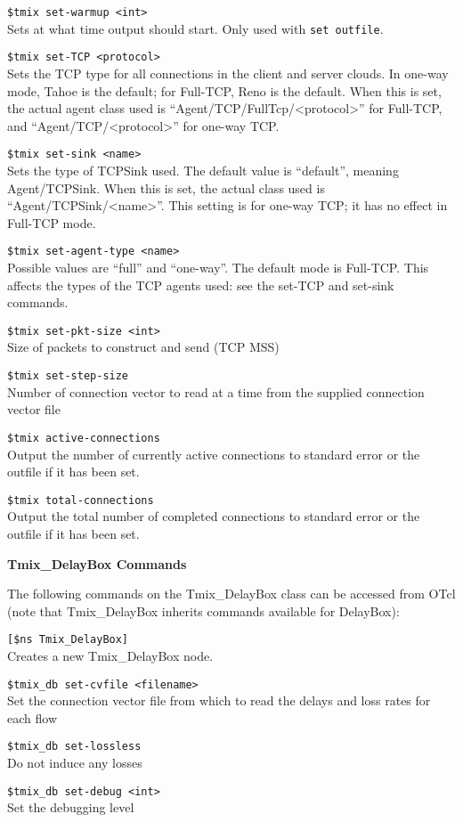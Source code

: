 {\tt \$tmix set-warmup <int>}\\
Sets at what time output should start.  Only used with {\tt set outfile}.

{\tt \$tmix set-TCP <protocol>}\\
Sets the TCP type for all connections in the client and server clouds. In one-way mode, Tahoe is the default; for Full-TCP, Reno is the default. When this is set, the actual agent class used is ``Agent/TCP/FullTcp/<protocol>'' for Full-TCP, and ``Agent/TCP/<protocol>'' for one-way TCP.

{\tt \$tmix set-sink <name>}\\
Sets the type of TCPSink used. The default value is ``default'', meaning Agent/TCPSink. When this is set, the actual class used is ``Agent/TCPSink/<name>''. This setting is for one-way TCP; it has no effect in Full-TCP mode.

{\tt \$tmix set-agent-type <name>}\\
Possible values are ``full'' and ``one-way''. The default mode is Full-TCP. This affects the types of the TCP agents used: see the set-TCP and set-sink commands.

{\tt \$tmix set-pkt-size <int>}\\
Size of packets to construct and send (TCP MSS)

{\tt \$tmix set-step-size}\\
Number of connection vector to read at a time from the supplied connection vector file

{\tt \$tmix active-connections}\\
Output the number of currently active connections to standard error or the
outfile if it has been set.

{\tt \$tmix total-connections}\\
Output the total number of completed connections to standard error or
the outfile if it has been set.


{\bf Tmix\_DelayBox Commands}

The following commands on the Tmix\_DelayBox class can be accessed
from OTcl (note that Tmix\_DelayBox inherits commands available for DelayBox):

{\tt [\$ns Tmix\_DelayBox]}\\
Creates a new Tmix\_DelayBox node.

{\tt \$tmix\_db set-cvfile <filename>}\\
Set the connection vector file from which to read the delays and loss rates for
each flow

{\tt \$tmix\_db set-lossless}\\
Do not induce any losses 

{\tt \$tmix\_db set-debug <int>}\\
Set the debugging level

%
